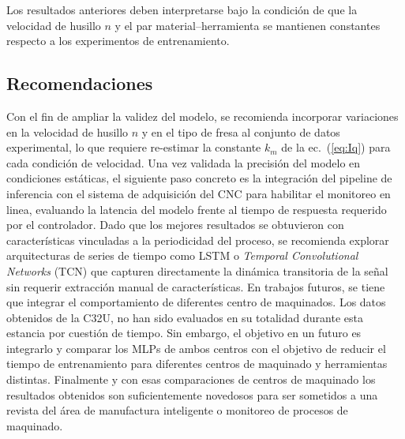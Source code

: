 \documentclass[12pt, letterpaper]{article}
\begin{document}
Los resultados anteriores deben interpretarse bajo la condición de que la velocidad de husillo $n$ y el par material--herramienta se mantienen constantes respecto a los experimentos de entrenamiento.

\subsection{Recomendaciones}

Con el fin de ampliar la validez del modelo, se recomienda incorporar variaciones en la velocidad de husillo $n$ y en el tipo de fresa al conjunto de datos experimental, lo que requiere re-estimar la constante $k_m$ de la ec.~(\ref{eq:Iq}) para cada condición de velocidad. Una vez validada la precisión del modelo en condiciones estáticas, el siguiente paso concreto es la integración del pipeline de inferencia con el sistema de adquisición del CNC para habilitar el monitoreo en linea, evaluando la latencia del modelo frente al tiempo de respuesta requerido por el controlador. Dado que los mejores resultados se obtuvieron con características vinculadas a la periodicidad del proceso, se recomienda explorar arquitecturas de series de tiempo como LSTM o \textit{Temporal Convolutional Networks} (TCN) que capturen directamente la dinámica transitoria de la señal sin requerir extracción manual de características. En trabajos futuros, se tiene que integrar el comportamiento de diferentes centro de maquinados. Los datos obtenidos de la C32U, no han sido evaluados en su totalidad durante esta estancia por cuestión de tiempo. Sin embargo, el objetivo en un futuro es integrarlo y comparar los MLPs de ambos centros con el objetivo de reducir el tiempo de entrenamiento para diferentes centros  de maquinado y herramientas distintas. 
Finalmente y con esas comparaciones de centros de maquinado los resultados obtenidos son suficientemente novedosos para ser sometidos a una revista del área de manufactura inteligente o monitoreo de procesos de maquinado.

\end{document}
